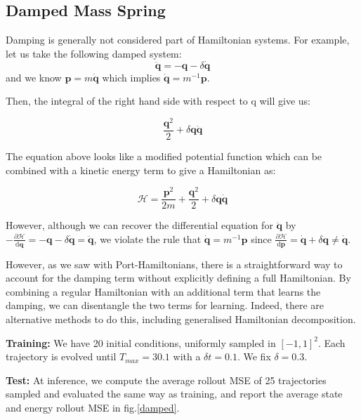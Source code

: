 \documentclass[twoside]{article}
\begin{document}
\subsection{Damped Mass Spring}

Damping is generally not considered part of Hamiltonian systems. For example, let us take the following damped system:
\begin{equation}
\ddot{\mathbf{q}} = -\mathbf{q} - \delta\dot{\mathbf{q}}
\end{equation}
and we know $\mathbf{p}=m\dot{\mathbf{q}}$ which implies $\dot{\mathbf{q}} = m^{-1}\mathbf{p}$.

Then, the integral of the right hand side with respect to q will give us:

\begin{equation}
\frac{\mathbf{q}^2}{2} + \delta \mathbf{q} \dot{\mathbf{q}}
\end{equation}

The equation above looks like a modified potential function which can be combined with a kinetic energy term to give a Hamiltonian as:

\begin{equation}
\mathcal{H} =\frac{ \mathbf{p}^2}{2m} + \frac{\mathbf{q}^2}{2} + \delta \mathbf{q} \dot{\mathbf{q}}
\end{equation}

However, although we can recover the differential equation for $\ddot{\mathbf{q}}$ by $-\frac{\partial\mathcal{H}}{\mathrm{d}\mathbf{q}}  =-\mathbf{q} - \delta\dot{\mathbf{q}} = \ddot{\mathbf{q}}$, we violate the rule that $\dot{\mathbf{q}} = m^{-1}\mathbf{p}$ since $ \frac{\partial\mathcal{H}}{\mathrm{d}\mathbf{p}} =  \dot{\mathbf{q}} +\delta \mathbf{q} \neq \dot{\mathbf{q}} $.


However, as we saw with Port-Hamiltonians, there is a straightforward way to account for the damping term without explicitly defining a full Hamiltonian. By combining a regular Hamiltonian with an additional term that learns the damping, we can disentangle the two terms for learning. Indeed, there are alternative methods to do this, including generalised Hamiltonian decomposition.

\textbf{Training:} We have 20 initial conditions, uniformly sampled in $[-1,1]^2$. Each trajectory is evolved until $T_{max} = 30.1$ with a $\delta t = 0.1$. We fix $\delta = 0.3$.

\textbf{Test:} At inference, we compute the average rollout MSE of 25 trajectories sampled and evaluated the same way as training, and report the average state and energy rollout MSE in fig.\ref{damped}.
\end{document}
